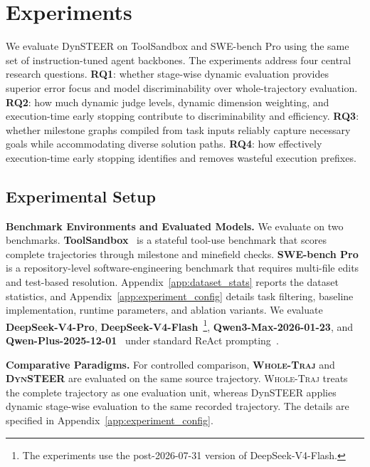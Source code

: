 \section{Experiments}
\label{sec:experiments}

We evaluate DynSTEER on ToolSandbox and SWE-bench Pro using the same set of instruction-tuned agent backbones. The experiments address four central research questions.
\textbf{RQ1}: whether stage-wise dynamic evaluation provides superior error focus and model discriminability over whole-trajectory evaluation.
\textbf{RQ2}: how much dynamic judge levels, dynamic dimension weighting, and execution-time early stopping contribute to discriminability and efficiency.
\textbf{RQ3}: whether milestone graphs compiled from task inputs reliably capture necessary goals while accommodating diverse solution paths.
\textbf{RQ4}: how effectively execution-time early stopping identifies and removes wasteful execution prefixes.

\subsection{Experimental Setup}
\label{sec:exp_setup}
\textbf{Benchmark Environments and Evaluated Models.} We evaluate on two benchmarks. \textbf{ToolSandbox}~\citep{gu2024toolsandbox} is a stateful tool-use benchmark that scores complete trajectories through milestone and minefield checks. \textbf{SWE-bench Pro}~\citep{deng2025swebenchpro} is a repository-level software-engineering benchmark that requires multi-file edits and test-based resolution. Appendix~\ref{app:dataset_stats} reports the dataset statistics, and Appendix~\ref{app:experiment_config} details task filtering, baseline implementation, runtime parameters, and ablation variants. We evaluate \textbf{DeepSeek-V4-Pro}, \textbf{DeepSeek-V4-Flash}~\citep{deepseekai2024deepseekv3}\footnote{The experiments use the post-2026-07-31 version of DeepSeek-V4-Flash.}, \textbf{Qwen3-Max-2026-01-23}, and \textbf{Qwen-Plus-2025-12-01}~\citep{yang2024qwen25} under standard ReAct prompting~\citep{yao2023react}.

\textbf{Comparative Paradigms.} For controlled comparison, \textbf{\textsc{Whole-Traj}} and \textbf{\textsc{DynSTEER}} are evaluated on the same source trajectory. \textsc{Whole-Traj} treats the complete trajectory as one evaluation unit, whereas DynSTEER applies dynamic stage-wise evaluation to the same recorded trajectory. The details are specified in Appendix~\ref{app:experiment_config}.

